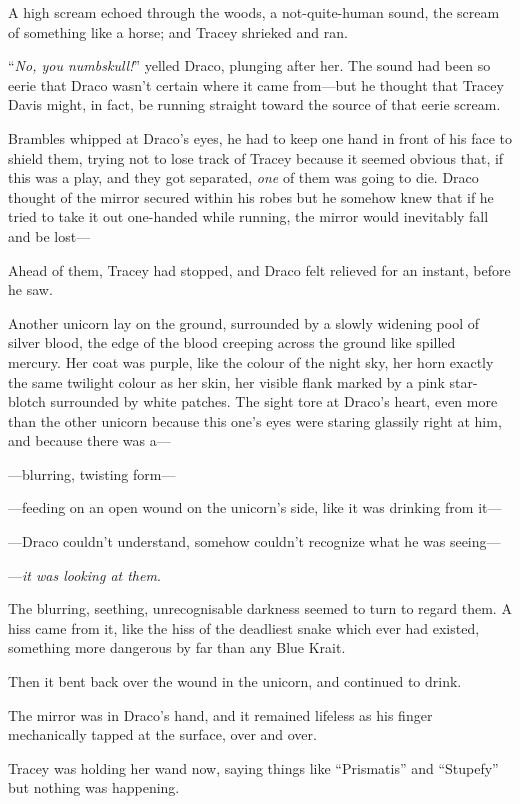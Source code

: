 A high scream echoed through the woods, a not-quite-human sound, the scream of something like a horse; and Tracey shrieked and ran.

“\emph{No, you numbskull!}” yelled Draco, plunging after her. The sound had been so eerie that Draco wasn’t certain where it came from—but he thought that Tracey Davis might, in fact, be running straight toward the source of that eerie scream.

Brambles whipped at Draco’s eyes, he had to keep one hand in front of his face to shield them, trying not to lose track of Tracey because it seemed obvious that, if this was a play, and they got separated, \emph{one} of them was going to die. Draco thought of the mirror secured within his robes but he somehow knew that if he tried to take it out one-handed while running, the mirror would inevitably fall and be lost—

Ahead of them, Tracey had stopped, and Draco felt relieved for an instant, before he saw.

Another unicorn lay on the ground, surrounded by a slowly widening pool of silver blood, the edge of the blood creeping across the ground like spilled mercury. Her coat was purple, like the colour of the night sky, her horn exactly the same twilight colour as her skin, her visible flank marked by a pink star-blotch surrounded by white patches. The sight tore at Draco’s heart, even more than the other unicorn because this one’s eyes were staring glassily right at him, and because there was a—

—blurring, twisting form—

—feeding on an open wound on the unicorn’s side, like it was drinking from it—

—Draco couldn’t understand, somehow couldn’t recognize what he was seeing—

—\emph{it was looking at them}.

The blurring, seething, unrecognisable darkness seemed to turn to regard them. A hiss came from it, like the hiss of the deadliest snake which ever had existed, something more dangerous by far than any Blue Krait.

Then it bent back over the wound in the unicorn, and continued to drink.

The mirror was in Draco’s hand, and it remained lifeless as his finger mechanically tapped at the surface, over and over.

Tracey was holding her wand now, saying things like “Prismatis” and “Stupefy” but nothing was happening.


